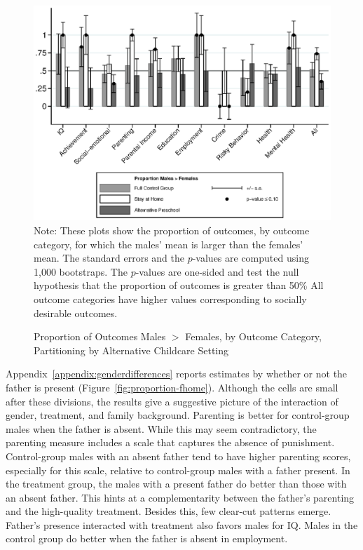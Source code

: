 \begin{figure}[H]
\centering
\caption{Proportion of Outcomes Males $>$ Females, by Outcome Category, Partitioning by Alternative Childcare Setting}
\label{fig:proportion-altpre}
	\includegraphics[width=\textwidth]{output/gendergaps-control-moderated-altpre}
\footnotesize \justify
Note: These plots show the proportion of outcomes, by outcome category, for which the males' mean is larger than the females' mean. The standard errors and the $p$-values are computed using 1,000 bootstraps. The $p$-values are one-sided and test the null hypothesis that the proportion of outcomes is greater than 50\% All outcome categories have higher values corresponding to socially desirable outcomes.
\end{figure}

Appendix~\ref{appendix:genderdifferences} reports estimates by whether or not the father is present (Figure~\ref{fig:proportion-fhome}). Although the cells are small after these divisions, the results give a suggestive picture of the interaction of gender, treatment, and family background. Parenting is better for control-group males when the father is absent. While this may seem contradictory, the parenting measure includes a scale that captures the absence of punishment. Control-group males with an absent father tend to have higher parenting scores, especially for this scale, relative to control-group males with a father present. In the treatment group, the males with a present father do better than those with an absent father. This hints at a complementarity between the father's parenting and the high-quality treatment. Besides this, few clear-cut patterns emerge. Father's presence interacted with treatment also favors males for IQ. Males in the control group do better when the father is absent in employment.

